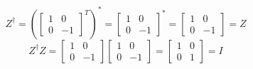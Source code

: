 \begin{example}
\[     \]
    \[
    Z^{\dagger}=\left(\begin{bmatrix} 1 & 0 \\ 0 & -1 \end{bmatrix}^T \right)^* = \begin{bmatrix} 1 & 0 \\ 0 & -1 \end{bmatrix}^* = \begin{bmatrix} 1 & 0 \\ 0 & -1 \end{bmatrix} =Z
    \]
    \[
    Z^{\dagger}Z=\begin{bmatrix} 1 & 0 \\ 0 & -1 \end{bmatrix} \begin{bmatrix} 1 & 0 \\ 0 & -1 \end{bmatrix} = \begin{bmatrix} 1 & 0 \\ 0 & 1 \end{bmatrix} = I
    \]
\end{example}

